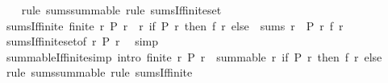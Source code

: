 \begin{isabellebody}
%
\isadelimproof
\ \ %
\endisadelimproof
%
\isatagproof
{}\isamarkupfalse%
\ {\isacharparenleft}{\kern0pt}rule\ sums{\isacharunderscore}{\kern0pt}summable{\isacharparenright}{\kern0pt}\ {\isacharparenleft}{\kern0pt}rule\ sums{\isacharunderscore}{\kern0pt}If{\isacharunderscore}{\kern0pt}finite{\isacharunderscore}{\kern0pt}set{\isacharparenright}{\kern0pt}%
\endisatagproof
{\isafoldproof}%
%
\isadelimproof
\isanewline
%
\endisadelimproof
\isanewline
{}\isamarkupfalse%
\ sums{\isacharunderscore}{\kern0pt}If{\isacharunderscore}{\kern0pt}finite{\isacharcolon}{\kern0pt}\ {\isachardoublequoteopen}finite\ {\isacharbraceleft}{\kern0pt}r{\isachardot}{\kern0pt}\ P\ r{\isacharbraceright}{\kern0pt}\ {\isasymLongrightarrow}\ {\isacharparenleft}{\kern0pt}{\isasymlambda}r{\isachardot}{\kern0pt}\ if\ P\ r\ then\ f\ r\ else\ {}{\isacharparenright}{\kern0pt}\ sums\ {\isacharparenleft}{\kern0pt}{\isasymSum}r\ {\isacharbar}{\kern0pt}\ P\ r{\isachardot}{\kern0pt}\ f\ r{\isacharparenright}{\kern0pt}{\isachardoublequoteclose}\isanewline
%
\isadelimproof
\ \ %
\endisadelimproof
%
\isatagproof
{}\isamarkupfalse%
\ sums{\isacharunderscore}{\kern0pt}If{\isacharunderscore}{\kern0pt}finite{\isacharunderscore}{\kern0pt}set{\isacharbrackleft}{\kern0pt}of\ {\isachardoublequoteopen}{\isacharbraceleft}{\kern0pt}r{\isachardot}{\kern0pt}\ P\ r{\isacharbraceright}{\kern0pt}{\isachardoublequoteclose}{\isacharbrackright}{\kern0pt}\ \isamarkupfalse%
\ simp%
\endisatagproof
{\isafoldproof}%
%
\isadelimproof
\isanewline
%
\endisadelimproof
\isanewline
{}\isamarkupfalse%
\ summable{\isacharunderscore}{\kern0pt}If{\isacharunderscore}{\kern0pt}finite{\isacharbrackleft}{\kern0pt}simp{\isacharcomma}{\kern0pt}\ intro{\isacharbrackright}{\kern0pt}{\isacharcolon}{\kern0pt}\ {\isachardoublequoteopen}finite\ {\isacharbraceleft}{\kern0pt}r{\isachardot}{\kern0pt}\ P\ r{\isacharbraceright}{\kern0pt}\ {\isasymLongrightarrow}\ summable\ {\isacharparenleft}{\kern0pt}{\isasymlambda}r{\isachardot}{\kern0pt}\ if\ P\ r\ then\ f\ r\ else\ {}{\isacharparenright}{\kern0pt}{\isachardoublequoteclose}\isanewline
%
\isadelimproof
\ \ %
\endisadelimproof
%
\isatagproof
{}\isamarkupfalse%
\ {\isacharparenleft}{\kern0pt}rule\ sums{\isacharunderscore}{\kern0pt}summable{\isacharparenright}{\kern0pt}\ {\isacharparenleft}{\kern0pt}rule\ sums{\isacharunderscore}{\kern0pt}If{\isacharunderscore}{\kern0pt}finite{\isacharparenright}{\kern0pt}%
\endisatagproof
{\isafoldproof}%
%
\isadelimproof
\isanewline
%
\endisadelimproof

\end{isabellebody}
